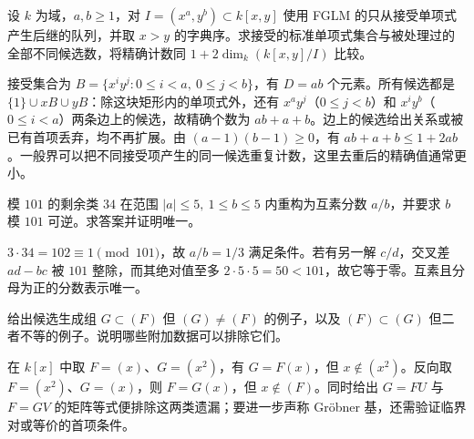\begin{exercise}\label{b3:ex:B-fglm-unit}
	设 \(k\) 为域，\(a,b\ge1\)，对 \(I=(x^a,y^b)\subset k[x,y]\) 使用 FGLM 的只从接受单项式产生后继的队列，并取 \(x>y\) 的字典序。求接受的标准单项式集合与被处理过的全部不同候选数，将精确计数同 \(1+2\dim_k(k[x,y]/I)\) 比较。
\end{exercise}
\begin{solution}
	接受集合为 \(B=\{x^iy^j:0\le i<a,\ 0\le j<b\}\)，有 \(D=ab\) 个元素。所有候选都是 \(\{1\}\cup xB\cup yB\)：除这块矩形内的单项式外，还有 \(x^ay^j\)（\(0\le j<b\)）和 \(x^iy^b\)（\(0\le i<a\)）两条边上的候选，故精确个数为 \(ab+a+b\)。边上的候选给出关系或被已有首项丢弃，均不再扩展。由 \((a-1)(b-1)\ge0\)，有 \(ab+a+b\le1+2ab\)。一般界可以把不同接受项产生的同一候选重复计数，这里去重后的精确值通常更小。
\end{solution}

\begin{exercise}\label{b3:ex:B-rational-reconstruction}
	模 \(101\) 的剩余类 \(34\) 在范围 \(|a|\le5,\ 1\le b\le5\) 内重构为互素分数 \(a/b\)，并要求 \(b\) 模 \(101\) 可逆。求答案并证明唯一。
\end{exercise}
\begin{solution}
	\(3\cdot34=102\equiv1\pmod{101}\)，故 \(a/b=1/3\) 满足条件。若有另一解 \(c/d\)，交叉差 \(ad-bc\) 被 \(101\) 整除，而其绝对值至多 \(2\cdot5\cdot5=50<101\)，故它等于零。互素且分母为正的分数表示唯一。
\end{solution}

\begin{exercise}\label{b3:ex:B-one-sided-certificate}
	给出候选生成组 \(G\subset(F)\) 但 \((G)\ne(F)\) 的例子，以及 \((F)\subset(G)\) 但二者不等的例子。说明哪些附加数据可以排除它们。
\end{exercise}
\begin{solution}
	在 \(k[x]\) 中取 \(F=(x)\)、\(G=(x^2)\)，有 \(G=F(x)\)，但 \(x\notin(x^2)\)。反向取 \(F=(x^2)\)、\(G=(x)\)，则 \(F=G(x)\)，但 \(x\notin(F)\)。同时给出 \(G=FU\) 与 \(F=GV\) 的矩阵等式便排除这两类遗漏；要进一步声称 Gröbner 基，还需验证临界对或等价的首项条件。
\end{solution}

